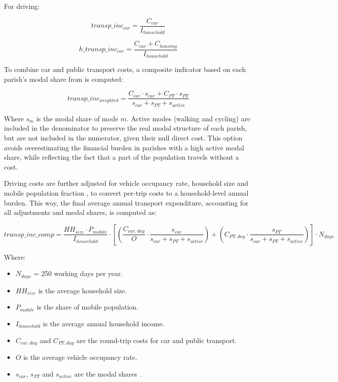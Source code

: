 \documentclass[
  authoryear,
  review,
  1p]{elsarticle}
\begin{document}
For driving:

\[ transp\_inc_{car} = \frac{C_{car}}{I_{household}} \]

\[ h\_transp\_inc_{car} = \frac{C_{car} + C_{housing}}{I_{household}} \]

To combine car and public transport costs, a composite indicator based
on each parish's modal share from \citet{census_2021_modal_share} is
computed:

\[ transp\_inc_{weighted} = \frac{C_{car} \cdot s_{car} + C_{PT} \cdot s_{PT}}{s_{car} + s_{PT} + s_{active}} \]

Where \(s_m\) is the modal share of mode \(m\). Active modes (walking
and cycling) are included in the denominator to preserve the real modal
structure of each parish, but are not included in the numerator, given
their null direct cost. This option avoids overestimating the financial
burden in parishes with a high active modal share, while reflecting the
fact that a part of the population travels without a cost.

Driving costs are further adjusted for vehicle occupancy rate, household
size and mobile population fraction \citep{INE_IMOB2017}, to convert
per-trip costs to a household-level annual burden. This way, the final
average annual transport expenditure, accounting for all adjustments and
modal shares, is computed as:

\[ transp\_inc\_comp = \frac{HH_{size} \cdot P_{mobile}}{I_{household}} \cdot \left[ \left( \frac{C_{car,day}}{O} \cdot \frac{s_{car}}{s_{car} + s_{PT} + s_{active}} \right) + (C_{PT,day} \cdot \frac{s_{PT}}{s_{car} + s_{PT} + s_{active}}) \right] \cdot N_{days} \]

Where:

\begin{itemize}
\item
  \(N_{days}\) = 250 working days per year.
\item
  \(HH_{size}\) is the average household size.
\item
  \(P_{mobile}\) is the share of mobile population.
\item
  \(I_{household}\) is the average annual household income.
\item
  \(C_{car,day}\) and \(C_{PT,day}\) are the round-trip costs for car
  and public transport.
\item
  \(O\) is the average vehicle occupancy rate.
\item
  \(s_{car}\), \(s_{PT}\) and \(s_{active}\) are the modal shares
  \citep{census_2021_modal_share}.
\end{itemize}
\end{document}
